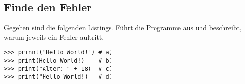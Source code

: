 \subsection{Finde den Fehler }
Gegeben sind die folgenden Listings. Führt die Programme aus und beschreibt, warum jeweils ein Fehler auftritt.
\begin{lstlisting}
>>> prinnt("Hello World!") # a)
>>> print(Hello World!)    # b)
>>> print("Alter: " + 18)  # c)
>>> print("Hello World!)   # d)
\end{lstlisting}

